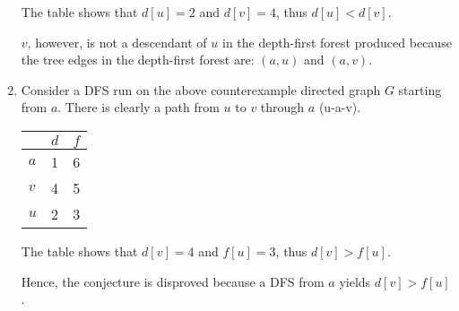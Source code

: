 \documentclass[a4paper]{report}
\begin{document}
\begin{enumerate}
      The table shows that $d[u]=2$ and $d[v]=4$, thus $d[u] < d[v]$.

      $v$, however, is not a descendant of $u$ in the depth-first forest produced because the tree edges 
      in the depth-first forest are: $(a,u)$ and $(a,v)$. 

    \par
    \bigskip

    \item

      Consider a DFS run on the above counterexample directed graph $G$ starting from $a$.  
      There is clearly a path from $u$ to $v$ through $a$ (u-a-v).

      \begin{center}
        \begin{tabular}{ l | c | r }
          \hline
            & $d$ & $f$ \\ \hline
          $a$ & 1 & 6 \\
          $v$ & 4 & 5 \\
          $u$ & 2 & 3 \\
          \hline  
        \end{tabular}
      \end{center}

      The table shows that $d[v]=4$ and $f[u]=3$, thus $d[v] > f[u]$.

      Hence, the conjecture is disproved because a DFS from $a$ yields $d[v] > f[u]$.


    \par
    \bigskip


\end{enumerate}
\end{document}
